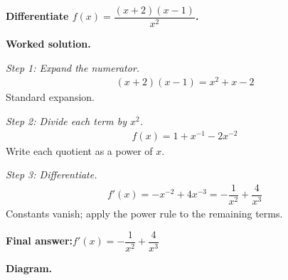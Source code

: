 \documentclass[11pt]{article}
\newcommand{\question}[1]{\par\medskip\noindent\textbf{#1}\par}
\begin{document}
\question{Differentiate \( f(x) = \dfrac{(x + 2)(x - 1)}{x^2} \).}

\textbf{Worked solution.}

\textit{Step 1: Expand the numerator.}
\[\begin{gathered}
(x+2)(x-1) = x^2 + x - 2
\end{gathered}\]
Standard expansion.

\textit{Step 2: Divide each term by \( x^2 \).}
\[\begin{gathered}
f(x) = 1 + x^{-1} - 2x^{-2}
\end{gathered}\]
Write each quotient as a power of \( x \).

\textit{Step 3: Differentiate.}
\[\begin{gathered}
f'(x) = -x^{-2} + 4x^{-3} = -\dfrac{1}{x^2} + \dfrac{4}{x^3}
\end{gathered}\]
Constants vanish; apply the power rule to the remaining terms.

\begin{answerbox}
\textbf{Final answer:}\quad \(\displaystyle  f'(x) = -\dfrac{1}{x^2} + \dfrac{4}{x^3} \)
\end{answerbox}
\textbf{Diagram.}
\end{document}
